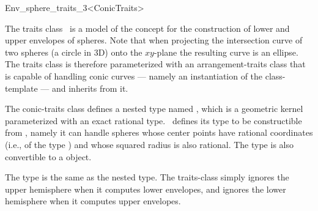 
\ccRefPageBegin

\begin{ccRefClass}{Env_sphere_traits_3<ConicTraits>}
    
\ccDefinition 

The traits class \ccRefName\ is a model of the 
concept for the construction of lower and upper envelopes of spheres.
Note that when projecting the intersection curve of two spheres (a
circle in 3D) onto the $xy$-plane the resulting curve is an ellipse.
The traits class is therefore parameterized with an arrangement-traits
class that is capable of handling conic curves --- namely an instantiation
of the  class-template --- and inherits from it.

The conic-traits class defines a nested type named ,
which is a geometric kernel parameterized with an exact rational type.
\ccRefName\ defines its  type to be constructible from
, namely it can handle spheres whose center
points have rational coordinates (i.e., of the type )
and whose squared radius is also rational. The  type is
also convertible to a  object.

The  type is the same as the nested
 type. The traits-class simply ignores the upper
hemisphere when it computes lower envelopes, and ignores the lower
hemisphere when it computes upper envelopes.

 
\ccIsModel

\ccInheritsFrom

\end{ccRefClass}

\ccRefPageEnd
